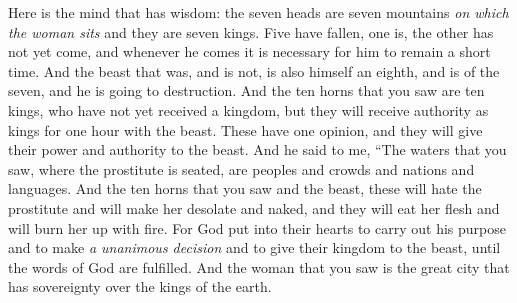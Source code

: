 \begin{biblechapter}
\verse Here is the mind that has wisdom: the seven heads are seven mountains \textit{on which the woman sits} and they are seven kings.
\verse Five have fallen, one is, the other has not yet come, and whenever he comes it is necessary for him to remain a short time.
\verse And the beast that was, and is not, is also himself an eighth, and is of the seven, and he is going to destruction.
\verse And the ten horns that you saw are ten kings, who have not yet received a kingdom, but they will receive authority as kings for one hour with the beast.
\verse These have one opinion, and they will give their power and authority to the beast.
\verse And he said to me, “The waters that you saw, where the prostitute is seated, are peoples and crowds and nations and languages.
\verse And the ten horns that you saw and the beast, these will hate the prostitute and will make her desolate and naked, and they will eat her flesh and will burn her up with fire.
\verse For God put into their hearts to carry out his purpose and to make \textit{a unanimous decision} and to give their kingdom to the beast, until the words of God are fulfilled.
\verse And the woman that you saw is the great city that has sovereignty over the kings of the earth.
\end{biblechapter}

